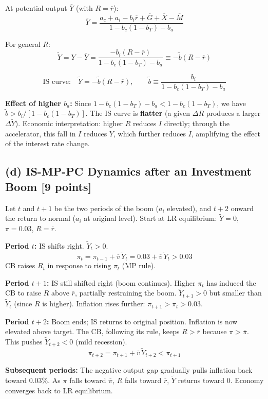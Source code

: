 \documentclass[letterpaper,12pt]{article}
\begin{document}
At potential output $\overline{Y}$ (with $R = \overline{r}$):
\[
\overline{Y} = \frac{a_c + a_i - b_i\overline{r} + \overline{G} + \overline{X}-\overline{M}}{1-b_c(1-b_T)-b_a}
\]

For general $R$:
\[
\widetilde{Y} = Y - \overline{Y} = \frac{-b_i(R-\overline{r})}{1-b_c(1-b_T)-b_a} \equiv -\tilde{b}(R-\overline{r})
\]

\textcolor{sol}{
\[
\text{IS curve:} \quad \widetilde{Y} = -\tilde{b}(R-\overline{r}), \qquad \tilde{b} \equiv \frac{b_i}{1-b_c(1-b_T)-b_a}
\]
}

\textbf{Effect of higher $b_a$:} Since $1-b_c(1-b_T)-b_a < 1-b_c(1-b_T)$, we have $\tilde{b} > b_i/[1-b_c(1-b_T)]$. The IS curve is \textbf{flatter} (a given $\Delta R$ produces a larger $\Delta\widetilde{Y}$). Economic interpretation: higher $R$ reduces $I$ directly; through the accelerator, this fall in $I$ reduces $Y$, which further reduces $I$, amplifying the effect of the interest rate change.

\subsection*{(d) IS-MP-PC Dynamics after an Investment Boom [9 points]}

Let $t$ and $t+1$ be the two periods of the boom ($a_i$ elevated), and $t+2$ onward the return to normal ($a_i$ at original level). Start at LR equilibrium: $\widetilde{Y}=0$, $\pi=0.03$, $R=\overline{r}$.

\noindent\textbf{Period $t$:} IS shifts right. $\widetilde{Y}_t > 0$.
\[
\pi_t = \pi_{t-1} + \overline{v}\,\widetilde{Y}_t = 0.03 + \overline{v}\,\widetilde{Y}_t > 0.03
\]
CB raises $R_t$ in response to rising $\pi_t$ (MP rule).

\noindent\textbf{Period $t+1$:} IS still shifted right (boom continues). Higher $\pi_t$ has induced the CB to raise $R$ above $\overline{r}$, partially restraining the boom. $\widetilde{Y}_{t+1} > 0$ but smaller than $\widetilde{Y}_t$ (since $R$ is higher). Inflation rises further: $\pi_{t+1} > \pi_t > 0.03$.

\noindent\textbf{Period $t+2$:} Boom ends; IS returns to original position. Inflation is now elevated above target. The CB, following its rule, keeps $R > \overline{r}$ because $\pi > \overline{\pi}$. This pushes $\widetilde{Y}_{t+2} < 0$ (mild recession).
\[
\pi_{t+2} = \pi_{t+1} + \overline{v}\,\widetilde{Y}_{t+2} < \pi_{t+1}
\]

\noindent\textbf{Subsequent periods:} The negative output gap gradually pulls inflation back toward 0.03\%. As $\pi$ falls toward $\overline{\pi}$, $R$ falls toward $\overline{r}$, $\widetilde{Y}$ returns toward 0. Economy converges back to LR equilibrium.
\end{document}
